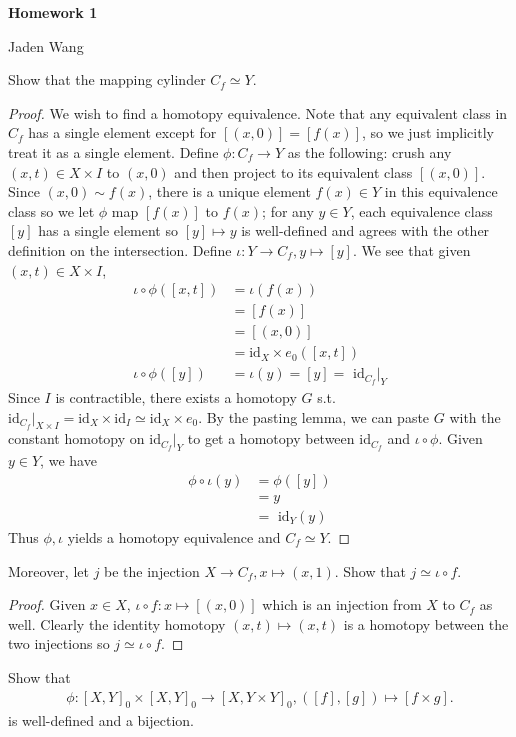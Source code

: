 \documentclass[12pt]{article}
\begin{document}
\centerline {\textsf{\textbf{\LARGE{Homework 1}}}}
\centerline {Jaden Wang}
\vspace{.15in}

\begin{problem}[1]
Show that the mapping cylinder $ C_f \simeq Y$.
\end{problem}
\begin{proof}
	We wish to find a homotopy equivalence. Note that any equivalent class in $ C_f$ has a single element except for $ [(x,0)] = [f(x)]$, so we just implicitly treat it as a single element. Define $ \phi: C_f \to Y$ as the following: crush any $ (x,t) \in X \times I$ to $(x,0)$ and then project to its equivalent class $ [(x,0)]$. Since $ (x,0) \sim f(x)$, there is a unique element $ f(x) \in Y$ in this equivalence class so we let $ \phi$ map $ [f(x)]$ to $ f(x)$; for any $ y \in Y$, each equivalence class $ [y]$ has a single element so $ [y]\mapsto y$ is well-defined and agrees with the other definition on the intersection. Define $ \iota:Y \to C_f, y \mapsto [y]$. We see that given $ (x,t) \in X \times I$,
	\begin{align*}
		\iota \circ \phi([x,t]) &= \iota(f(x)) \\
				       &= [f(x)] \\
				       &= [(x,0)] \\
				       &= \text{id}_{ X} \times e_0 ([x,t]) \\
		\iota \circ \phi([y]) &= \iota(y) = [y] = \text{ id}_{ C_f}|_{Y}
\end{align*}
Since $ I$ is contractible, there exists a homotopy $ G$ s.t.\ $ \text{id}_{C_f }|_{X \times I}= \text{id}_{ X} \times \text{id}_{ I} \simeq \text{id}_{ X} \times e_0$. By the pasting lemma, we can paste $ G$ with the constant homotopy on  $ \text{id}_{ C_f}|_{Y}$ to get a homotopy between  $ \text{id}_{ C_f}$ and $ \iota \circ \phi$. Given $ y \in Y$, we have
\begin{align*}
		\phi \circ \iota (y) &= \phi([y]) \\
		&= y \\
		&= \text{ id}_{ Y}(y) 
	\end{align*}
Thus $ \phi, \iota$ yields a homotopy equivalence and $ C_f \simeq Y$.
\end{proof}
Moreover, let $ j$ be the injection  $ X \to C_f, x \mapsto (x,1)$. Show that $ j \simeq \iota \circ f$.
\begin{proof}
	Given $ x \in X$, $ \iota \circ f:x \mapsto [(x,0)]$ which is an injection from $ X$ to  $ C_f$ as well. Clearly the identity homotopy $ (x,t) \mapsto (x,t)$ is a homotopy between the two injections so $ j \simeq \iota \circ f$.
\end{proof}
\begin{problem}[2]
Show that
	\begin{align*}
	\phi:	[X,Y]_0 \times [X,Y]_0 \to [X, Y\times Y]_0, ([f],[g]) \mapsto [f \times g].
	\end{align*}
	is well-defined and a bijection. 
\end{problem}
\end{document}
